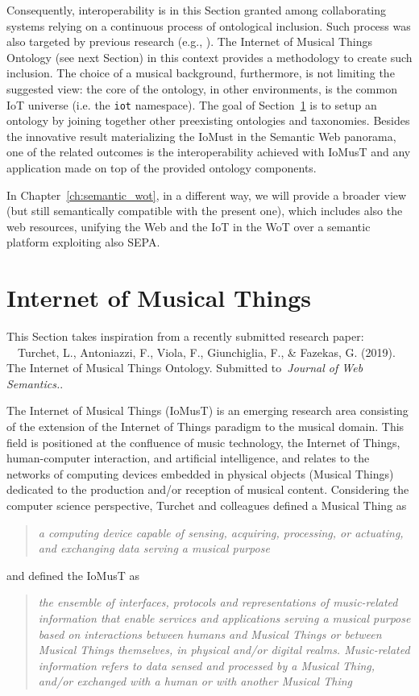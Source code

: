 Consequently, interoperability is in this Section granted among collaborating systems relying on a continuous process of ontological inclusion. Such process was also targeted by previous research (e.g., \cite{halpin2010owl, calvanese2015ontology}). The Internet of Musical Things Ontology (see next Section) in this context provides a methodology to create such inclusion. The choice of a musical background, furthermore, is not limiting the suggested view: the core of the ontology, in other environments, is the common IoT universe (i.e. the \texttt{iot} namespace). The goal of Section~\ref{sec:iomust} is to setup an ontology by joining together other preexisting ontologies and taxonomies. Besides the innovative result materializing the IoMust in the Semantic Web panorama, one of the related outcomes is the interoperability achieved with IoMusT and any application made on top of the provided ontology components.

In Chapter~\ref{ch:semantic_wot}, in a different way, we will provide a broader view (but still semantically compatible with the present one), which includes also the web resources, unifying the Web and the IoT in the WoT over a semantic platform exploiting also SEPA.

\section{Internet of Musical Things}
\label{sec:iomust}
This Section takes inspiration from a recently submitted research paper: \faCopyright~~Turchet, L., Antoniazzi, F., Viola, F., Giunchiglia, F., \& Fazekas, G. (2019). The Internet of Musical Things Ontology. Submitted to~\textit{Journal of Web Semantics.}.

The Internet of Musical Things (IoMusT) is an emerging research area consisting of the extension of the Internet of Things paradigm to the musical domain. This field is positioned at the confluence of music technology, the Internet of Things, human-computer interaction, and artificial intelligence, and relates to the networks of computing devices embedded in physical objects (Musical Things) dedicated to the production and/or reception of musical content. Considering the computer science perspective, Turchet and colleagues \cite{turchet2018IoMusT} defined a Musical Thing as 
\begin{quote}
\textit{a computing device capable of sensing, acquiring, processing, or actuating, and exchanging data serving a musical purpose}
\end{quote} 
and defined the IoMusT as 
\begin{quote}
\textit{the ensemble of interfaces, protocols and representations of music-related information that enable services and applications serving a musical purpose based on interactions between humans and Musical Things or between Musical Things themselves, in physical and/or digital realms. Music-related information refers to data sensed and processed by a Musical Thing, and/or exchanged with a human or with another Musical Thing}
\end{quote}
  
